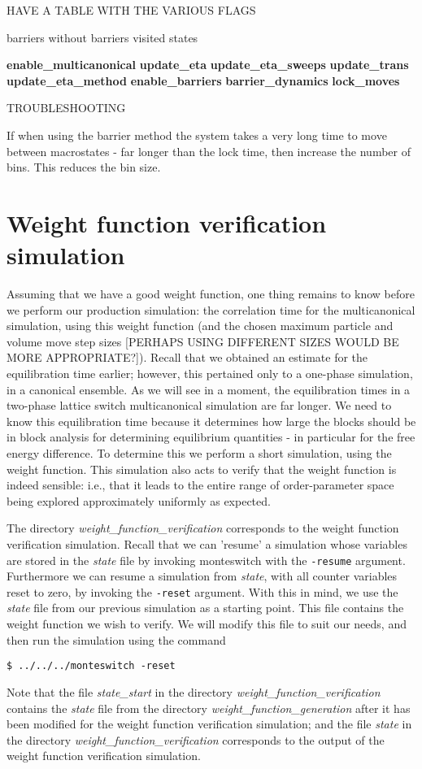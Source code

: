 \documentclass{report}
\begin{document}
HAVE A TABLE WITH THE VARIOUS FLAGS

       	     	      	      barriers         without barriers           visited states

\textbf{enable\_multicanonical}
\textbf{update\_eta}
\textbf{update\_eta\_sweeps}
\textbf{update\_trans}
\textbf{update\_eta\_method}
\textbf{enable\_barriers}
\textbf{barrier\_dynamics}
\textbf{lock\_moves}



TROUBLESHOOTING

If when using the barrier method the system takes a very long time to move between macrostates - far longer than the lock time, then increase the
number of bins. This reduces the bin size.


\section{Weight function verification simulation}

Assuming that we have a good weight function, one thing remains to know before we perform our production simulation: the correlation time for the
multicanonical simulation, using this weight function (and the chosen maximum particle and volume move step sizes [PERHAPS USING DIFFERENT SIZES WOULD
BE MORE APPROPRIATE?]). Recall that we obtained an estimate for the equilibration time earlier; however, this pertained only to a one-phase simulation,
in a canonical ensemble. As we will see in a moment, the equilibration times in a two-phase lattice switch multicanonical simulation are far longer. 
We need to know this equilibration time because it determines how large the blocks should be in block analysis for determining equilibrium quantities - 
in particular for the free energy difference. To determine this we perform a short simulation, using the weight function. This simulation also acts to
verify that the weight function is indeed sensible: i.e., that it leads to the entire range of order-parameter space being explored approximately 
uniformly as expected.

The directory \emph{weight\_function\_verification} corresponds to the weight function verification simulation.
Recall that we can 'resume' a simulation whose variables are stored in the \emph{state} file by invoking monteswitch with the \texttt{-resume} argument. 
Furthermore
we can resume a simulation from \emph{state}, with all counter variables reset to zero, by invoking the \texttt{-reset} argument. With this in mind, we
use the \emph{state} file from our previous simulation as a starting point. This file contains the weight function we wish to verify. We will modify this
file to suit our needs, and then run the simulation using the command
\begin{verbatim}
$ ../../../monteswitch -reset
\end{verbatim}
Note that the file \emph{state\_start} in the directory \emph{weight\_function\_verification} contains the \emph{state} file from the directory 
\emph{weight\_function\_generation}
after it has been modified for the weight function verification simulation; and the file \emph{state} in the directory \emph{weight\_function\_verification}
corresponds to the output of the weight function verification simulation.
\end{document}
